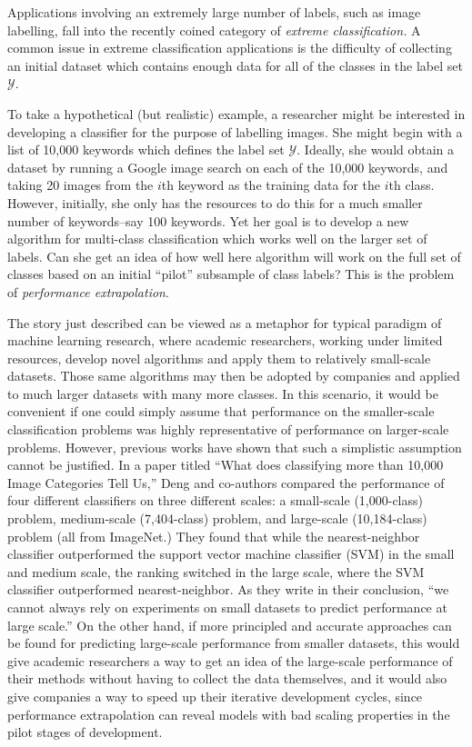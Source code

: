\documentclass[12pt]{article}
\begin{document}
Applications involving an extremely large number of labels, such as
image labelling, fall into the recently coined category
of \emph{extreme classification.}  A common issue in extreme
classification applications is the difficulty of collecting an initial
dataset which contains enough data for all of the classes in the label
set $\mathcal{Y}$.

To take a hypothetical (but realistic) example, a researcher might be
interested in developing a classifier for the purpose of labelling
images.  She might begin with a list of 10,000 keywords which defines
the label set $\mathcal{Y}$.  Ideally, she would obtain a dataset by
running a Google image search on each of the 10,000 keywords, and
taking 20 images from the $i$th keyword as the training data for the
$i$th class.  However, initially, she only has the resources to do
this for a much smaller number of keywords--say 100 keywords.  Yet her
goal is to develop a new algorithm for multi-class classification
which works well on the larger set of labels.  Can she get an idea of
how well here algorithm will work on the full set of classes based on
an initial ``pilot'' subsample of class labels?  This is the problem
of \emph{performance extrapolation}.

The story just described can be viewed as a metaphor for typical
paradigm of machine learning research, where academic researchers,
working under limited resources, develop novel algorithms and apply
them to relatively small-scale datasets.  Those same algorithms may
then be adopted by companies and applied to much larger datasets with
many more classes.  In this scenario, it would be convenient if one
could simply assume that performance on the smaller-scale
classification problems was highly representative of performance on
larger-scale problems.  However, previous works have shown that such a
simplistic assumption cannot be justified.  In a paper titled ``What
does classifying more than 10,000 Image Categories Tell Us,'' Deng and
co-authors compared the performance of four different classifiers on
three different scales: a small-scale (1,000-class) problem,
medium-scale (7,404-class) problem, and large-scale (10,184-class)
problem (all from ImageNet.)  They found that while the
nearest-neighbor classifier outperformed the support vector machine
classifier (SVM) in the small and medium scale, the ranking switched
in the large scale, where the SVM classifier outperformed
nearest-neighbor.  As they write in their conclusion, ``we cannot
always rely on experiments on small datasets to predict performance at
large scale.''  On the other hand, if more principled and accurate
approaches can be found for predicting large-scale performance from
smaller datasets, this would give academic researchers a way to get an
idea of the large-scale performance of their methods without having to
collect the data themselves, and it would also give companies a way to
speed up their iterative development cycles, since performance
extrapolation can reveal models with bad scaling properties in the
pilot stages of development.
\end{document}
